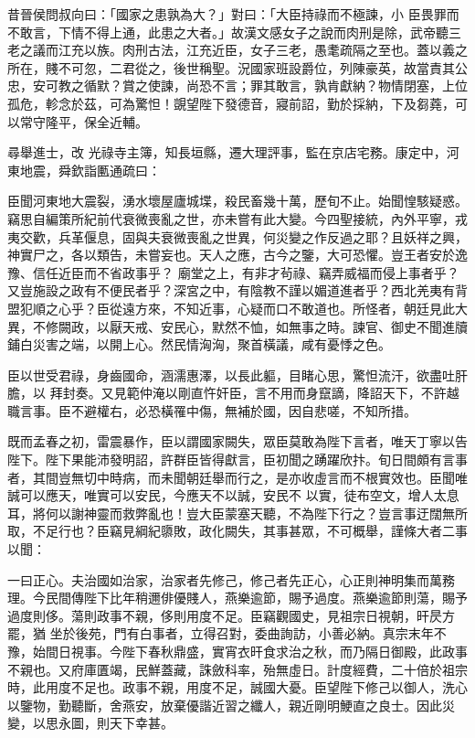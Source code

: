 \begin{pinyinscope}
 昔晉侯問叔向曰：「國家之患孰為大？」對曰：「大臣持祿而不極諫，小
 臣畏罪而不敢言，下情不得上通，此患之大者。」故漢文感女子之說而肉刑是除，武帝聽三老之議而江充以族。肉刑古法，江充近臣，女子三老，愚耄疏隔之至也。蓋以義之所在，賤不可忽，二君從之，後世稱聖。況國家班設爵位，列陳豪英，故當責其公忠，安可教之循默？賞之使諫，尚恐不言；罪其敢言，孰肯獻納？物情閉塞，上位孤危，軫念於茲，可為驚怛！覬望陛下發德音，寢前詔，勤於採納，下及芻蕘，可以常守隆平，保全近輔。



 尋舉進士，改
 光祿寺主簿，知長垣縣，遷大理評事，監在京店宅務。康定中，河東地震，舜欽詣匭通疏曰：



 臣聞河東地大震裂，湧水壞屋廬城堞，殺民畜幾十萬，歷旬不止。始聞惶駭疑惑。竊思自編策所紀前代衰微喪亂之世，亦未嘗有此大變。今四聖接統，內外平寧，戎夷交歡，兵革偃息，固與夫衰微喪亂之世異，何災變之作反過之耶？且妖祥之興，神實尸之，各以類告，未嘗妄也。天人之應，古今之鑒，大可恐懼。豈王者安於逸豫、信任近臣而不省政事乎？
 廟堂之上，有非才茍祿、竊弄威福而侵上事者乎？又豈施設之政有不便民者乎？深宮之中，有陰教不謹以媚道進者乎？西北羌夷有背盟犯順之心乎？臣從遠方來，不知近事，心疑而口不敢道也。所怪者，朝廷見此大異，不修闕政，以厭天戒、安民心，默然不恤，如無事之時。諫官、御史不聞進牘鋪白災害之端，以開上心。然民情洶洶，聚首橫議，咸有憂悸之色。



 臣以世受君祿，身齒國命，涵濡惠澤，以長此軀，目睹心思，驚怛流汗，欲盡吐肝膽，以
 拜封奏。又見範仲淹以剛直忤奸臣，言不用而身竄謫，降詔天下，不許越職言事。臣不避權右，必恐橫罹中傷，無補於國，因自悲嗟，不知所措。



 既而孟春之初，雷震暴作，臣以謂國家闕失，眾臣莫敢為陛下言者，唯天丁寧以告陛下。陛下果能沛發明詔，許群臣皆得獻言，臣初聞之踴躍欣抃。旬日間頗有言事者，其間豈無切中時病，而未聞朝廷舉而行之，是亦收虛言而不根實效也。臣聞唯誠可以應天，唯實可以安民，今應天不以誠，安民不
 以實，徒布空文，增人太息耳，將何以謝神靈而救弊亂也！豈大臣蒙塞天聽，不為陛下行之？豈言事迂闊無所取，不足行也？臣竊見綱紀隳敗，政化闕失，其事甚眾，不可概舉，謹條大者二事以聞：



 一曰正心。夫治國如治家，治家者先修己，修己者先正心，心正則神明集而萬務理。今民間傳陛下比年稍邇俳優賤人，燕樂逾節，賜予過度。燕樂逾節則蕩，賜予過度則侈。蕩則政事不親，侈則用度不足。臣竊觀國史，見祖宗日視朝，旰昃方罷，猶
 坐於後苑，門有白事者，立得召對，委曲詢訪，小善必納。真宗末年不豫，始間日視事。今陛下春秋鼎盛，實宵衣旰食求治之秋，而乃隔日御殿，此政事不親也。又府庫匱竭，民鮮蓋藏，誅斂科率，殆無虛日。計度經費，二十倍於祖宗時，此用度不足也。政事不親，用度不足，誠國大憂。臣望陛下修己以御人，洗心以鑒物，勤聽斷，舍燕安，放棄優諧近習之纖人，親近剛明鯁直之良士。因此災變，以思永圖，則天下幸甚。




\end{pinyinscope}
